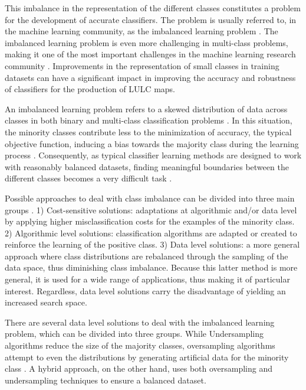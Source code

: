 \documentclass[parskip=full]{scrartcl}
\begin{document}
This imbalance in the representation of the different classes constitutes a
problem for the development of accurate classifiers. The problem is usually
referred to, in the machine learning community, as the imbalanced learning
problem \cite{Chawla2004}. The imbalanced learning problem is even more
challenging in multi-class problems, making it one of the most important
challenges in the machine learning research community \cite{Garcia2018}.
Improvements in the representation of small classes in training datasets can
have a significant impact in improving the accuracy and robustness of
classifiers for the production of LULC maps.

An imbalanced learning problem refers to a skewed distribution of data across
classes in both binary and multi-class classification problems \cite{Abdi2016}.
In this situation, the minority classes contribute less to the minimization of
accuracy, the typical objective function, inducing a bias towards the majority
class during the learning process \cite{Douzas2019}. Consequently, as typical
classifier learning methods are designed to work with reasonably balanced
datasets, finding meaningful boundaries between the different classes becomes a
very difficult task \cite{Saez2016}.

Possible approaches to deal with class imbalance can be divided into three main
groups \cite{Fernandez2013}. 1) Cost-sensitive solutions: adaptations at
algorithmic and/or data level by applying higher misclassification costs for the
examples of the minority class. 2) Algorithmic level solutions: classification
algorithms are adapted or created to reinforce the learning of the positive
class. 3) Data level solutions: a more general approach where class
distributions are rebalanced through the sampling of the data space, thus
diminishing class imbalance. Because this latter method is more general, it is
used for a wide range of applications, thus making it of particular interest.
Regardless, data level solutions carry the disadvantage of yielding an increased
search space.

There are several data level solutions to deal with the imbalanced learning
problem, which can be divided into three groups. While Undersampling algorithms
reduce the size of the majority classes, oversampling algorithms attempt to even
the distributions by generating artificial data for the minority class
\cite{Mellor2015}. A hybrid approach, on the other hand, uses both oversampling
and undersampling techniques to ensure a balanced dataset.
\end{document}
